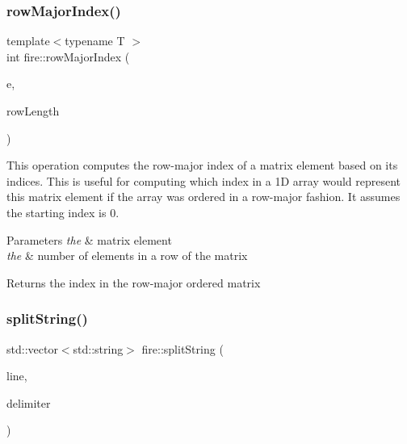 \subsubsection{\texorpdfstring{row\+Major\+Index()}{rowMajorIndex()}\hspace{0.1cm}{\footnotesize\ttfamily [2/2]}}
{\footnotesize\ttfamily template$<$typename T $>$ \\
int fire\+::row\+Major\+Index (\begin{DoxyParamCaption}\item[{\hyperlink{a00189_a1a12603621e7a1efa59ac5cb79f9d509}{Matrix\+Element}$<$ T $>$}]{e,  }\item[{int}]{row\+Length }\end{DoxyParamCaption})\hspace{0.3cm}{\ttfamily [inline]}}

This operation computes the row-\/major index of a matrix element based on its indices. This is useful for computing which index in a 1D array would represent this matrix element if the array was ordered in a row-\/major fashion. It assumes the starting index is 0. 
\begin{DoxyParams}{Parameters}
{\em the} & matrix element \\
\hline
{\em the} & number of elements in a row of the matrix \\
\hline
\end{DoxyParams}
\begin{DoxyReturn}{Returns}
the index in the row-\/major ordered matrix 
\end{DoxyReturn}
\mbox{\label{a00189_ac3f0360fae13ec5b8b93251c695e1821}} 
\subsubsection{\texorpdfstring{split\+String()}{splitString()}\hspace{0.1cm}{\footnotesize\ttfamily [1/2]}}
{\footnotesize\ttfamily std\+::vector$<$std\+::string$>$ fire\+::split\+String (\begin{DoxyParamCaption}\item[{const std\+::string \&}]{line,  }\item[{const std\+::string \&}]{delimiter }\end{DoxyParamCaption})\hspace{0.3cm}{\ttfamily [inline]}}

